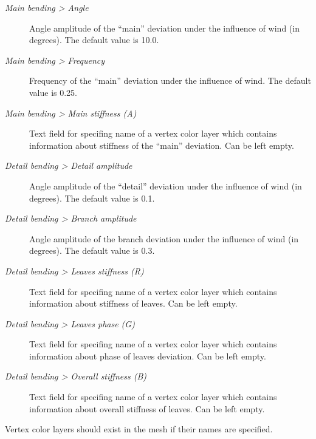 \documentclass[a4paper,12pt,oneside]{sphinxmanual}
\begin{document}
\begin{DUlineblock}{0em}
\item[] 
\end{DUlineblock}
\begin{description}
\item[{\emph{Main bending \textgreater{} Angle}}] \leavevmode
Angle amplitude of the ``main'' deviation under the influence of wind (in degrees). The default value is 10.0.

\item[{\emph{Main bending \textgreater{} Frequency}}] \leavevmode
Frequency of the ``main'' deviation under the influence of wind. The default value is 0.25.

\item[{\emph{Main bending \textgreater{} Main stiffness (A)}}] \leavevmode
Text field for specifing name of a vertex color layer which contains information about stiffness of the ``main'' deviation. Can be left empty.

\item[{\emph{Detail bending \textgreater{} Detail amplitude}}] \leavevmode
Angle amplitude of the ``detail'' deviation under the influence of wind (in degrees). The default value is 0.1.

\item[{\emph{Detail bending \textgreater{} Branch amplitude}}] \leavevmode
Angle amplitude of the branch deviation under the influence of wind (in degrees). The default value is 0.3.

\item[{\emph{Detail bending \textgreater{} Leaves stiffness (R)}}] \leavevmode
Text field for specifing name of a vertex color layer which contains information about stiffness of leaves. Can be left empty.

\item[{\emph{Detail bending \textgreater{} Leaves phase (G)}}] \leavevmode
Text field for specifing name of a vertex color layer which contains information about phase of leaves deviation. Can be left empty.

\item[{\emph{Detail bending \textgreater{} Overall stiffness (B)}}] \leavevmode
Text field for specifing name of a vertex color layer which contains information about overall stiffness of leaves. Can be left empty.

\end{description}

Vertex color layers should exist in the mesh if their names are specified.
\end{document}
